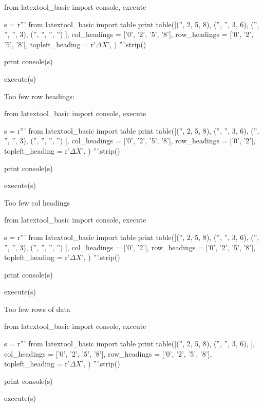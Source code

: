 \begin{python}
from latextool_basic import console, execute

s = r'''
from latextool_basic import table
print table([('',  2, 5,  8),
             ('', '', 3,  6),
             ('', '', '', 3),
             ('', '', '', '')
            ],
            col_headings = ['0', '2', '5', '8'],
            row_headings = ['0', '2', '5', '8'],
            topleft_heading = r'$\Delta X$',
           )
'''.strip()

print console(s)

execute(s)

\end{python}




\newpage
Too few row headings:
\begin{python}
from latextool_basic import console, execute

s = r'''
from latextool_basic import table
print table([('',  2, 5,  8),
             ('', '', 3,  6),
             ('', '', '', 3),
             ('', '', '', '')
            ],
            col_headings = ['0', '2', '5', '8'],
            row_headings = ['0', '2'],
            topleft_heading = r'$\Delta X$',
           )
'''.strip()

print console(s)

execute(s)

\end{python}



\newpage
Too few col headings
\begin{python}
from latextool_basic import console, execute

s = r'''
from latextool_basic import table
print table([('',  2, 5,  8),
             ('', '', 3,  6),
             ('', '', '', 3),
             ('', '', '', '')
            ],
            col_headings = ['0', '2'],
            row_headings = ['0', '2', '5', '8'],
            topleft_heading = r'$\Delta X$',
           )
'''.strip()

print console(s)

execute(s)

\end{python}






\newpage
Too few rows of data
\begin{python}
from latextool_basic import console, execute

s = r'''
from latextool_basic import table
print table([('',  2, 5,  8),
             ('', '', 3,  6),
            ],
            col_headings = ['0', '2', '5', '8'],
            row_headings = ['0', '2', '5', '8'],
            topleft_heading = r'$\Delta X$',
           )
'''.strip()

print console(s)

execute(s)

\end{python}







